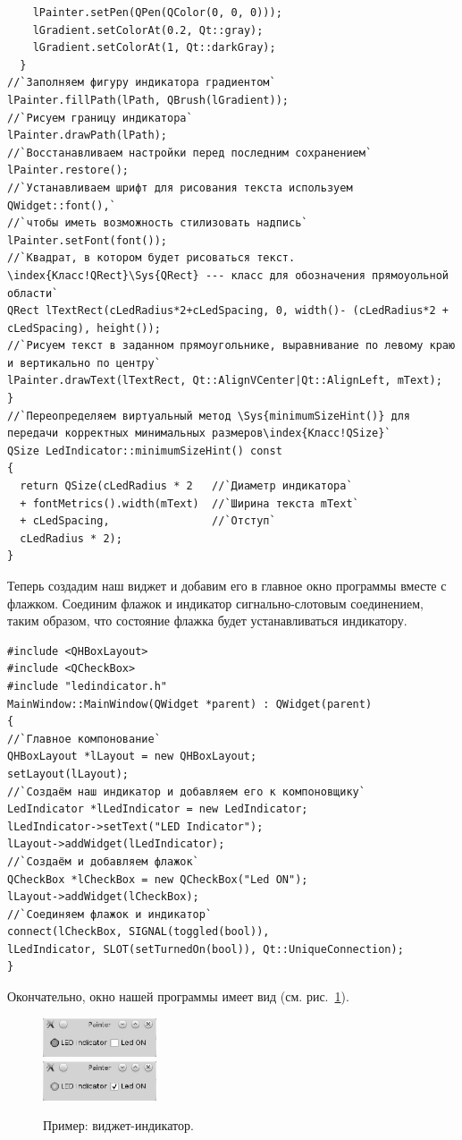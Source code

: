 \begin{lstlisting}
    lPainter.setPen(QPen(QColor(0, 0, 0)));
    lGradient.setColorAt(0.2, Qt::gray);
    lGradient.setColorAt(1, Qt::darkGray);
  }
//`Заполняем фигуру индикатора градиентом`
lPainter.fillPath(lPath, QBrush(lGradient));
//`Рисуем границу индикатора`
lPainter.drawPath(lPath);
//`Восстанавливаем настройки перед последним сохранением`
lPainter.restore();
//`Устанавливаем шрифт для рисования текста используем QWidget::font(),` 
//`чтобы иметь возможность стилизовать надпись`
lPainter.setFont(font());
//`Квадрат, в котором будет рисоваться текст. \index{Класс!QRect}\Sys{QRect} --- класс для обозначения прямоуольной области`
QRect lTextRect(cLedRadius*2+cLedSpacing, 0, width()- (cLedRadius*2 + cLedSpacing), height());
//`Рисуем текст в заданном прямоугольнике, выравнивание по левому краю и вертикально по центру`
lPainter.drawText(lTextRect, Qt::AlignVCenter|Qt::AlignLeft, mText);
}
//`Переопределяем виртуальный метод \Sys{minimumSizeHint()} для передачи корректных минимальных размеров\index{Класс!QSize}`
QSize LedIndicator::minimumSizeHint() const
{
  return QSize(cLedRadius * 2   //`Диаметр индикатора`
  + fontMetrics().width(mText)  //`Ширина текста mText`
  + cLedSpacing,                //`Отступ`
  cLedRadius * 2);
}
\end{lstlisting}

Теперь создадим наш виджет и добавим его в главное окно программы вместе с флажком. Соединим флажок и индикатор
сигнально-слотовым соединением, таким образом, что состояние флажка будет устанавливаться индикатору.
\begin{lstlisting}
#include <QHBoxLayout>
#include <QCheckBox>
#include "ledindicator.h"
MainWindow::MainWindow(QWidget *parent) : QWidget(parent)
{
//`Главное компонование`
QHBoxLayout *lLayout = new QHBoxLayout;
setLayout(lLayout);
//`Создаём наш индикатор и добавляем его к компоновщику`
LedIndicator *lLedIndicator = new LedIndicator;
lLedIndicator->setText("LED Indicator");
lLayout->addWidget(lLedIndicator);
//`Создаём и добавляем флажок`
QCheckBox *lCheckBox = new QCheckBox("Led ON");
lLayout->addWidget(lCheckBox);
//`Соединяем флажок и индикатор`
connect(lCheckBox, SIGNAL(toggled(bool)),
lLedIndicator, SLOT(setTurnedOn(bool)), Qt::UniqueConnection);
}
\end{lstlisting}

Окончательно, окно нашей программы имеет вид (см. рис.~\ref{ch14:refDrawing2}).

\begin{figure}[htb]
\begin{center}
\includegraphics[width=0.3\textwidth]{img/ris_14_3a}\\
\includegraphics[width=0.3\textwidth]{img/ris_14_3b}
\caption[Пример: виджет-индикатор.]{Пример: виджет-индикатор.}
\label{ch14:refDrawing2}
\end{center}
\end{figure}

